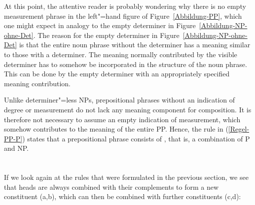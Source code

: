 At this point, the attentive reader is probably wondering why there is no empty measurement phrase in
the left"=hand figure of Figure~\ref{Abbildung-PP}, which one might expect in analogy to the empty determiner in Figure~\ref{Abbildung-NP-ohne-Det}.
The reason for the empty determiner in Figure~\ref{Abbildung-NP-ohne-Det} is that the entire noun phrase
without the determiner has a meaning similar to those with a determiner. The meaning normally contributed
by the visible determiner has to somehow be incorporated in the structure of the noun phrase. This
can be done by the empty determiner with an appropriately specified meaning contribution.

Unlike determiner"=less NPs, prepositional phrases without an indication of degree or measurement do
not lack any meaning component for composition. It is therefore not necessary to assume an empty indication of measurement, which
somehow contributes to the meaning of the entire PP. Hence, the rule in (\ref{Regel-PP-P}) states that a
prepositional phrase consists of \pbar, that is, a combination of P and NP.

\section{\xbart}
\label{sec-xbar}

If  we look again at the rules that were formulated in the previous section, we see that heads are always 
combined with their complements to form a new constituent (a,b), which can then be combined with further constituents (c,d):

